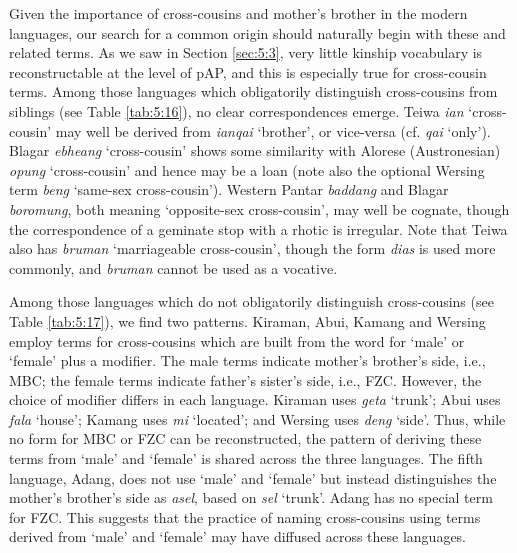 Given the importance of cross-cousins and mother's brother in the modern languages, our search for a common origin should naturally begin with these and related terms. As we saw in Section \ref{sec:5:3}, very little kinship vocabulary is reconstructable at the level of pAP, and this is especially true for cross-cousin terms. Among those languages which obligatorily distinguish cross-cousins from siblings (see Table \ref{tab:5:16}), no clear correspondences emerge. Teiwa \textit{ian} `cross-cousin' may well be derived from \textit{ianqai} `brother', or vice-versa (cf. \textit{qai} `only'). Blagar \textit{ebheang} `cross-cousin' shows some similarity with Alorese (Austronesian) \textit{opung} `cross-cousin' and hence may be a loan (note also the optional Wersing term \textit{beng} `same-sex cross-cousin'). Western Pantar \textit{baddang} and Blagar \textit{boromung}, both meaning `opposite-sex cross-cousin', may well be cognate, though the correspondence of a geminate stop with a rhotic is irregular. Note that Teiwa also has \textit{bruman} `marriageable cross-cousin', though the form \textit{dias} is used more commonly, and \textit{bruman} cannot be used as a vocative.  

Among those languages which do not obligatorily distinguish cross-cousins (see Table \ref{tab:5:17}), we find two patterns. Kiraman, Abui, Kamang and Wersing employ terms for cross-cousins which are built from the word for `male' or `female' plus a modifier. The male terms indicate mother's brother's side, i.e., MBC; the female terms indicate father's sister's side, i.e., FZC. However, the choice of modifier differs in each language. Kiraman uses \textit{geta} `trunk'; Abui uses \textit{fala} `house'; Kamang uses \textit{mi} `located'; and Wersing uses \textit{deng} `side'. Thus, while no form for MBC or FZC can be reconstructed, the pattern of deriving these terms from `male' and `female' is shared across the three languages. The fifth language, Adang, does not use `male' and `female' but instead distinguishes the mother's brother's side as \textit{asel}, based on \textit{sel} `trunk'. Adang has no special term for FZC. This suggests that the practice of naming cross-cousins using terms derived from `male' and `female' may have diffused across these languages.

